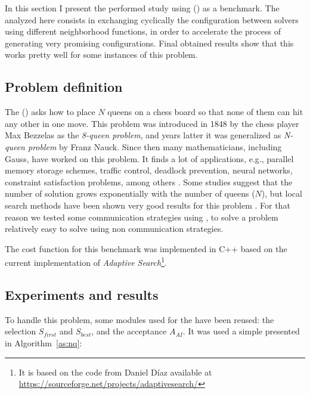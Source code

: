 In this section I present the performed study using \nqp{} (\NQP) as a benchmark. The \commstr{} analyzed here consists in exchanging cyclically the configuration between solvers using different neighborhood functions, in order to accelerate the process of generating very promising configurations. Final obtained results show that this \commstr{} works pretty well for some instances of this problem.

\subsection{Problem definition}

The \nqp{} (\NQP) asks how to place $N$ queens on a chess board so that none of them can hit any other in one move. This problem was introduced in 1848 by the chess player Max Bezzelas as the \textit{8-queen problem}, and years latter it was generalized as \textit{N-queen problem} by Franz Nauck. Since then many mathematicians, including Gauss, have worked on this problem. It finds a lot of applications, e.g., parallel memory storage schemes, traffic control, deadlock prevention, neural networks, constraint satisfaction problems, among others \cite{Bell2009}. Some studies suggest that the number of solution grows exponentially with the number of queens ($N$), but local search methods have been shown very good results for this problem \cite{Sosic1994}. For that reason we tested some communication strategies using \posl{}, to solve a problem relatively easy to solve using non communication strategies.

The cost function for this benchmark was implemented in C++ based on the current implementation of {\it Adaptive Search}\footnote{It is based on the code from Daniel D\'{i}az available at \href{https://sourceforge.net/projects/adaptivesearch/}{https://sourceforge.net/projects/adaptivesearch/}}.

\subsection{Experiments and results}

To handle this problem, some modules used for the \sgp{} have been reused: the selection \oms{} $S_{first}$ and $S_{best}$, and the acceptance \om{} $A_{AI}$. It was used a simple \as{} presented in Algorithm~\ref{as:nq}:

